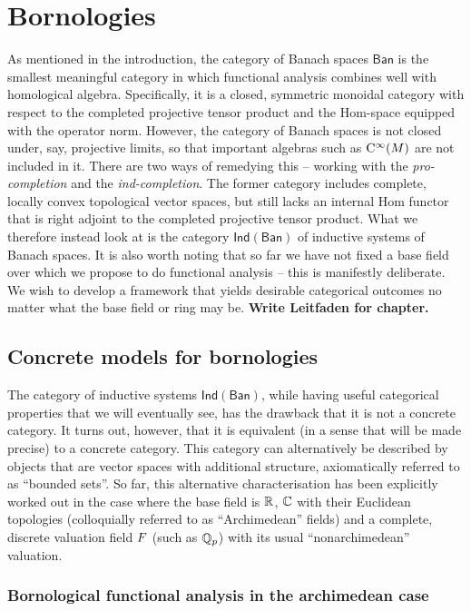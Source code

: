 \part{Bornologies}

As mentioned in the introduction, the category of Banach spaces \(\mathsf{Ban}\) is the smallest meaningful category in which functional analysis combines well with homological algebra. Specifically, it is a closed, symmetric monoidal category with respect to the completed projective tensor product and the Hom-space equipped with the operator norm.  However, the category of Banach spaces is not closed under, say, projective limits, so that important algebras such as \(\mathrm{C}^\infty(M)\) are not included in it. There are two ways of remedying this -- working with the \emph{pro-completion} and the \emph{ind-completion}. The former category includes complete, locally convex topological vector spaces, but still lacks an internal Hom functor that is right adjoint to the completed projective tensor product. What we therefore instead look at is the category \(\mathsf{Ind}(\mathsf{Ban})\) of inductive systems of Banach spaces. It is also worth noting that so far we have not fixed a base field over which we propose to do functional analysis -- this is manifestly deliberate. We wish to develop a framework that yields desirable categorical outcomes no matter what the base field or ring may be.  \textbf{Write Leitfaden for chapter.}


\chapter{Concrete models for bornologies}

The category of inductive systems \(\mathsf{Ind}(\mathsf{Ban})\), while having useful categorical properties that we will eventually see, has the drawback that it is not a concrete category. It turns out, however, that it is equivalent (in a sense that will be made precise) to a concrete category. This category can alternatively be described by objects that are vector spaces with additional structure, axiomatically referred to as ``bounded sets''. So far, this alternative characterisation has been explicitly worked out in the case where the base field is \(\mathbb R\), \(\mathbb C\) with their Euclidean topologies (colloquially referred to as ``Archimedean'' fields) and a complete, discrete valuation field \(F\) (such as \(\mathbb Q_p\)) with its usual ``nonarchimedean'' valuation.  

\section{Bornological functional analysis in the archimedean case}

